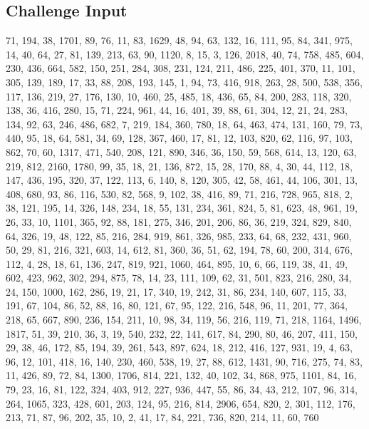 \subsection*{Challenge Input}\label{challenge-input-12}

71, 194, 38, 1701, 89, 76, 11, 83, 1629, 48, 94, 63, 132, 16, 111, 95,
84, 341, 975, 14, 40, 64, 27, 81, 139, 213, 63, 90, 1120, 8, 15, 3, 126,
2018, 40, 74, 758, 485, 604, 230, 436, 664, 582, 150, 251, 284, 308,
231, 124, 211, 486, 225, 401, 370, 11, 101, 305, 139, 189, 17, 33, 88,
208, 193, 145, 1, 94, 73, 416, 918, 263, 28, 500, 538, 356, 117, 136,
219, 27, 176, 130, 10, 460, 25, 485, 18, 436, 65, 84, 200, 283, 118,
320, 138, 36, 416, 280, 15, 71, 224, 961, 44, 16, 401, 39, 88, 61, 304,
12, 21, 24, 283, 134, 92, 63, 246, 486, 682, 7, 219, 184, 360, 780, 18,
64, 463, 474, 131, 160, 79, 73, 440, 95, 18, 64, 581, 34, 69, 128, 367,
460, 17, 81, 12, 103, 820, 62, 116, 97, 103, 862, 70, 60, 1317, 471,
540, 208, 121, 890, 346, 36, 150, 59, 568, 614, 13, 120, 63, 219, 812,
2160, 1780, 99, 35, 18, 21, 136, 872, 15, 28, 170, 88, 4, 30, 44, 112,
18, 147, 436, 195, 320, 37, 122, 113, 6, 140, 8, 120, 305, 42, 58, 461,
44, 106, 301, 13, 408, 680, 93, 86, 116, 530, 82, 568, 9, 102, 38, 416,
89, 71, 216, 728, 965, 818, 2, 38, 121, 195, 14, 326, 148, 234, 18, 55,
131, 234, 361, 824, 5, 81, 623, 48, 961, 19, 26, 33, 10, 1101, 365, 92,
88, 181, 275, 346, 201, 206, 86, 36, 219, 324, 829, 840, 64, 326, 19,
48, 122, 85, 216, 284, 919, 861, 326, 985, 233, 64, 68, 232, 431, 960,
50, 29, 81, 216, 321, 603, 14, 612, 81, 360, 36, 51, 62, 194, 78, 60,
200, 314, 676, 112, 4, 28, 18, 61, 136, 247, 819, 921, 1060, 464, 895,
10, 6, 66, 119, 38, 41, 49, 602, 423, 962, 302, 294, 875, 78, 14, 23,
111, 109, 62, 31, 501, 823, 216, 280, 34, 24, 150, 1000, 162, 286, 19,
21, 17, 340, 19, 242, 31, 86, 234, 140, 607, 115, 33, 191, 67, 104, 86,
52, 88, 16, 80, 121, 67, 95, 122, 216, 548, 96, 11, 201, 77, 364, 218,
65, 667, 890, 236, 154, 211, 10, 98, 34, 119, 56, 216, 119, 71, 218,
1164, 1496, 1817, 51, 39, 210, 36, 3, 19, 540, 232, 22, 141, 617, 84,
290, 80, 46, 207, 411, 150, 29, 38, 46, 172, 85, 194, 39, 261, 543, 897,
624, 18, 212, 416, 127, 931, 19, 4, 63, 96, 12, 101, 418, 16, 140, 230,
460, 538, 19, 27, 88, 612, 1431, 90, 716, 275, 74, 83, 11, 426, 89, 72,
84, 1300, 1706, 814, 221, 132, 40, 102, 34, 868, 975, 1101, 84, 16, 79,
23, 16, 81, 122, 324, 403, 912, 227, 936, 447, 55, 86, 34, 43, 212, 107,
96, 314, 264, 1065, 323, 428, 601, 203, 124, 95, 216, 814, 2906, 654,
820, 2, 301, 112, 176, 213, 71, 87, 96, 202, 35, 10, 2, 41, 17, 84, 221,
736, 820, 214, 11, 60, 760

